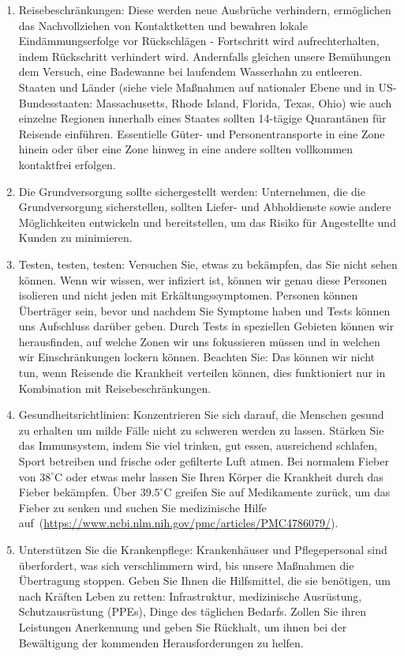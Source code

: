 \documentclass[onecolumn,journal]{IEEEtran}
\begin{document}
\begin{multicols}{2}
\begin{enumerate}
\item Reisebeschränkungen: Diese werden neue Ausbrüche verhindern, ermöglichen das Nachvollziehen von Kontaktketten und bewahren lokale Eindämmungserfolge vor Rückschlägen - Fortschritt wird aufrechterhalten, indem Rückschritt verhindert wird. Andernfalls gleichen unsere Bemühungen dem Versuch, eine Badewanne bei laufendem Wasserhahn zu entleeren. Staaten und Länder (siehe viele Maßnahmen auf nationaler Ebene und in US-Bundesstaaten: Massachusetts, Rhode Island, Florida, Texas, Ohio) wie auch einzelne Regionen innerhalb eines Staates sollten 14-tägige Quarantänen für Reisende einführen. Essentielle Güter- und Personentransporte in eine Zone hinein oder über eine Zone hinweg in eine andere sollten vollkommen kontaktfrei erfolgen.
\item Die Grundversorgung sollte sichergestellt werden: Unternehmen, die die Grundversorgung sicherstellen, sollten Liefer- und Abholdienste sowie andere Möglichkeiten entwickeln und bereitstellen, um das Risiko für Angestellte und Kunden zu minimieren.
\item Testen, testen, testen: Versuchen Sie, etwas zu bekämpfen, das Sie nicht sehen können. Wenn wir wissen, wer infiziert ist, können wir genau diese Personen isolieren und nicht jeden mit Erkältungssymptomen. Personen können Überträger sein, bevor und nachdem Sie Symptome haben und Tests können uns Aufschluss darüber geben. Durch Tests in speziellen Gebieten können wir herausfinden, auf welche Zonen wir uns fokussieren müssen und in welchen wir Einschränkungen lockern können. Beachten Sie: Das können wir nicht tun, wenn Reisende die Krankheit verteilen können, dies funktioniert nur in Kombination mit Reisebeschränkungen.
\item Gesundheitsrichtlinien: Konzentrieren Sie sich darauf, die Menschen gesund zu erhalten um milde Fälle nicht zu schweren werden zu lassen. Stärken Sie das Immunsystem, indem Sie viel trinken, gut essen, ausreichend schlafen, Sport betreiben und frische oder gefilterte Luft atmen. Bei normalem Fieber von $38^\circ$C oder etwas mehr lassen Sie Ihren Körper die Krankheit durch das Fieber bekämpfen. Über $39.5^\circ$C greifen Sie auf Medikamente zurück, um das Fieber zu senken und suchen Sie medizinische Hilfe auf~(\url{https://www.ncbi.nlm.nih.gov/pmc/articles/PMC4786079/}).
\item Unterstützen Sie die Krankenpflege: Krankenhäuser und Pflegepersonal sind überfordert, was sich verschlimmern wird, bis unsere Maßnahmen die Übertragung stoppen. Geben Sie Ihnen die Hilfsmittel, die sie benötigen, um nach Kräften Leben zu retten: Infrastruktur, medizinische Ausrüstung, Schutzausrüstung (PPEs), Dinge des täglichen Bedarfs. Zollen Sie ihren Leistungen Anerkennung und geben Sie Rückhalt, um ihnen bei der Bewältigung der kommenden Herausforderungen zu helfen.
\end{enumerate}

\end{multicols}




% 
\end{document}
